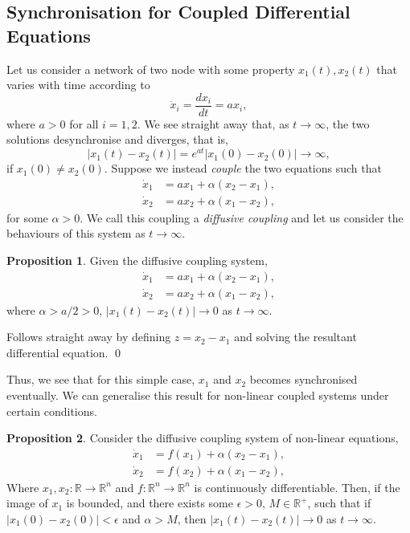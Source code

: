 \documentclass[
]{article}
\theoremstyle{definition}
\newtheorem{prop}{Proposition}[theorem]
\theoremstyle{definition}
\begin{document}
\hypertarget{synchronisation-for-coupled-differential-equations}{%
\subsection{Synchronisation for Coupled Differential
Equations}\label{synchronisation-for-coupled-differential-equations}}

Let us consider a network of two node with some property
\(x_1(t), x_2(t)\) that varies with time according to
\[\dot x_i = \frac{dx_i}{dt} = ax_i,\] where \(a > 0\) for all
\(i = 1, 2\). We see straight away that, as \(t \to \infty\), the two
solutions desynchronise and diverges, that is,
\[\left| x_1(t) - x_2(t) \right| = e^{at} \left| x_1(0) - x_2(0) \right| \to \infty,\]
if \(x_1(0) \neq x_2(0)\). Suppose we instead \emph{couple} the two
equations such that \begin{align*}
  \dot x_1 & = ax_1 + \alpha(x_2 - x_1),\\
  \dot x_2 & = ax_2 + \alpha(x_1 - x_2),
\end{align*} for some \(\alpha > 0\). We call this coupling a
\emph{diffusive coupling} and let us consider the behaviours of this
system as \(t \to \infty\).

\begin{prop}
  Given the diffusive coupling system, 
  \begin{align*}
    \dot x_1 & = ax_1 + \alpha(x_2 - x_1),\\
    \dot x_2 & = ax_2 + \alpha(x_1 - x_2),
  \end{align*}
  where \(\alpha > a / 2 > 0\), \(\left| x_1(t) - x_2(t) \right| \to 0\) as 
  \(t \to \infty\).
\end{prop}
\proof

Follows straight away by defining \(z = x_2 - x_1\) and solving the
resultant differential equation. \qed

Thus, we see that for this simple case, \(x_1\) and \(x_2\) becomes
synchronised eventually. We can generalise this result for non-linear
coupled systems under certain conditions.

\begin{prop}
  Consider the diffusive coupling system of non-linear equations,
  \begin{align*}
    \dot x_1 & = f(x_1) + \alpha (x_2 - x_1),\\
    \dot x_2 & = f(x_2) + \alpha (x_1 - x_2),
  \end{align*}
  Where \(x_1, x_2 : \mathbb{R} \to \mathbb{R}^n\) and 
  \(f : \mathbb{R}^n \to \mathbb{R}^n\) is continuously differentiable.
  Then, if the image of \(x_1\) is bounded, and there exists some 
  \(\epsilon > 0\), \(M \in \mathbb{R}^+\), such that if 
  \(\left| x_1(0) - x_2(0) \right| < \epsilon\) and \(\alpha > M\), then 
  \(\left| x_1(t) - x_2(t) \right| \to 0\) as \(t \to \infty\).
\end{prop}
\proof
\end{document}
